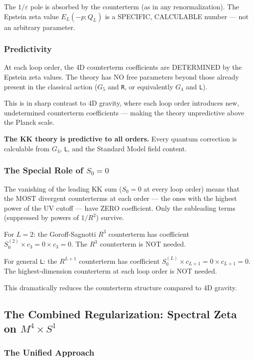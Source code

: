 \documentclass[aps,prd,preprint,superscriptaddress,longbibliography,floatfix]{revtex4-2}
\theoremstyle{remark}
\begin{document}
The $1/\varepsilon$ pole is absorbed by the counterterm (as in any renormalization). The Epstein zeta value $E_L(-p; Q_L)$ is a SPECIFIC, CALCULABLE number --- not an arbitrary parameter.


\subsubsection{Predictivity}

At each loop order, the 4D counterterm coefficients are DETERMINED by the Epstein zeta values. The theory has NO free parameters beyond those already present in the classical action ($G_{5}$ and \texttt{R}, or equivalently $G_{4}$ and \texttt{L}).

This is in sharp contrast to 4D gravity, where each loop order introduces new, undetermined counterterm coefficients --- making the theory unpredictive above the Planck scale.

\textbf{The KK theory is predictive to all orders.} Every quantum correction is calculable from $G_{4}$, \texttt{L}, and the Standard Model field content.


\subsubsection{The Special Role of $S_{0} = 0$}

The vanishing of the leading KK sum ($S_{0} = 0$ at every loop order) means that the MOST divergent counterterms at each order --- the ones with the highest power of the UV cutoff --- have ZERO coefficient. Only the subleading terms (suppressed by powers of $1/R^{2}$) survive.

For $L = 2$: the Goroff-Sagnotti $R^{3}$ counterterm has coefficient $S_{0}^{(2)} \times c_{3} = 0 \times c_{3} = 0$. The $R^{3}$ counterterm is NOT needed.

For general \texttt{L}: the $R^{L+1}$ counterterm has coefficient $S_{0}^{(L)} \times c_{L+1} = 0 \times c_{L+1} = 0$. The highest-dimension counterterm at each loop order is NOT needed.

This dramatically reduces the counterterm structure compared to 4D gravity.



\subsection{The Combined Regularization: Spectral Zeta on $M^{4} \times S^{1}$}


\subsubsection{The Unified Approach}
\end{document}
